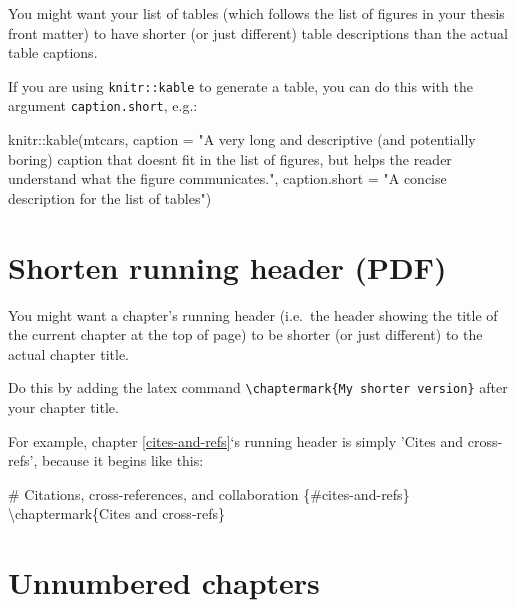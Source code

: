 \documentclass[a4paper, nobind]{templates/ociamthesis}
\newenvironment{Shaded}{\begin{snugshade}}{\end{snugshade}}
\newcommand{\AttributeTok}[1]{\textcolor[rgb]{0.77,0.63,0.00}{#1}}
\newcommand{\FunctionTok}[1]{\textcolor[rgb]{0.00,0.00,0.00}{#1}}
\newcommand{\NormalTok}[1]{#1}
\newcommand{\SpecialCharTok}[1]{\textcolor[rgb]{0.00,0.00,0.00}{#1}}
\newcommand{\StringTok}[1]{\textcolor[rgb]{0.31,0.60,0.02}{#1}}
\renewenvironment{Shaded}
{
  \vspace{10pt}%
  \begin{snugshade}%
}{%
  \end{snugshade}%
  \vspace{8pt}%
}
\begin{document}
You might want your list of tables (which follows the list of figures in your thesis front matter) to have shorter (or just different) table descriptions than the actual table captions.

If you are using \texttt{knitr::kable} to generate a table, you can do this with the argument \texttt{caption.short}, e.g.:

\begin{Shaded}
\begin{Highlighting}[]
\NormalTok{knitr}\SpecialCharTok{::}\FunctionTok{kable}\NormalTok{(mtcars,}
              \AttributeTok{caption =} \StringTok{"A very long and descriptive (and potentially}
\StringTok{              boring) caption that doesn\textquotesingle{}t fit in the list of figures,}
\StringTok{              but helps the reader understand what the figure }
\StringTok{              communicates."}\NormalTok{,}
              \AttributeTok{caption.short =} \StringTok{"A concise description for the list of tables"}\NormalTok{)}
\end{Highlighting}
\end{Shaded}

\hypertarget{shorten-running-header-pdf}{%
\section{Shorten running header (PDF)}\label{shorten-running-header-pdf}}

You might want a chapter's running header (i.e.~the header showing the title of the current chapter at the top of page) to be shorter (or just different) to the actual chapter title.

Do this by adding the latex command \texttt{\textbackslash{}chaptermark\{My\ shorter\ version\}} after your chapter title.

For example, chapter \ref{cites-and-refs}`s running header is simply 'Cites and cross-refs', because it begins like this:

\begin{Shaded}
\begin{Highlighting}[]
\FunctionTok{\# Citations, cross{-}references, and collaboration \{\#cites{-}and{-}refs\} }
\NormalTok{\textbackslash{}chaptermark\{Cites and cross{-}refs\}}
\end{Highlighting}
\end{Shaded}

\hypertarget{unnumbered-chapters}{%
\section{Unnumbered chapters}\label{unnumbered-chapters}}
\end{document}
